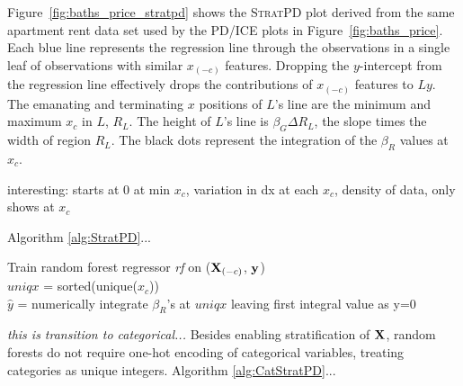\documentclass[12pt]{article}
\newcommand{\figref}[1]{Figure~\ref{#1}}
\newcommand{\spd}{\fontfamily{cmr}\textsc{\small StratPD}}
\begin{document}
\figref{fig:baths_price_stratpd} shows the \spd{} plot derived from the same apartment rent data set used by the PD/ICE plots in \figref{fig:baths_price}. Each blue line represents the regression line through the observations in a single leaf of observations with similar $x_{(-c)}$ features. Dropping the $y$-intercept from the regression line effectively drops the contributions of $x_{(-c)}$ features to $Ly$.  The emanating and terminating $x$ positions of $L$'s line are the minimum and maximum $x_c$ in $L$, $R_L$. The height of $L$'s line is $\beta_G \Delta{}R_L$, the slope times the width of region $R_L$. The black dots represent the integration of the $\beta_R$ values at $x_c$.

interesting: starts at 0 at min $x_c$, variation in dx at each $x_c$, density of data, only shows at $x_c$

Algorithm \ref{alg:StratPD}...

\setlength{\algomargin}{5pt}
\begin{algorithm}[H]
\label{alg:StratPD}
\LinesNumbered
{}
\SetAlgoSkip{}
\SetInd{.5em}{.5em}
Train random forest regressor {\it rf} on (${\bf X}_{(-c)}$, $\bf y$)\\
$uniqx$ = sorted(unique($x_c$))\\
$\hat{y}$ = numerically integrate $\beta_R$'s at $uniqx$ leaving first integral value as y=0\\
\end{algorithm}

{\em this is transition to categorical...} Besides enabling stratification of $\bf X$, random forests do not require one-hot encoding of categorical variables, treating categories as unique integers. Algorithm \ref{alg:CatStratPD}...
\end{document}

